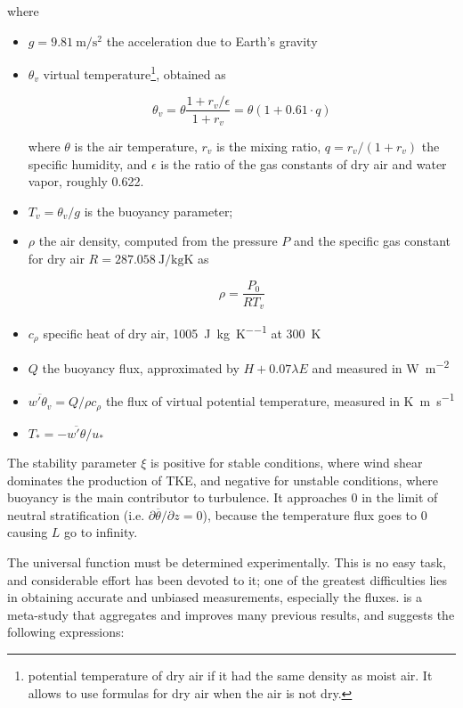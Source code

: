 \documentclass[a4paper]{book}
\begin{document}
\noindent where

\begin{itemize}
\item $g=\SI{9.81}{\meter\per\square\second}$ the acceleration due to Earth's gravity

\item $\theta_v$ virtual temperature\footnote{potential temperature of dry air if it had the same density as moist air. It allows to use formulas for dry air when the air is not dry.}, obtained as

\begin{equation}
\label{eq:vtemp}
\theta_v=\theta\frac{1+r_v/\epsilon}{1+r_v}=\theta(1+0.61\cdot q)
\end{equation}

\noindent where $\theta$ is the air temperature, $r_v$ is the mixing ratio, $q=r_v/(1+r_v)$ the specific humidity, and $\epsilon$ is the ratio of the gas constants of dry air and water vapor, roughly 0.622.

\item $T_v=\theta_v/g$ is the buoyancy parameter;

\item $\rho$ the air density, computed from the pressure $P$ and the specific gas constant for dry air $R=\SI{287.058}{\joule\per\kilo\gram\kelvin}$ as

$$
\rho=\frac{P_0}{RT_v}
$$


\item $c_\rho$ specific heat of dry air, \SI{1005}{\joule\per\kilo\gram\per\kelvin} at \SI{300}{\kelvin}
\item $Q$ the buoyancy flux, approximated by $H+0.07\lambda E$ and measured in \si{\watt\per\square\meter}
\item $\overline{w'\theta_v}=Q/\rho c_\rho$ the flux of virtual potential temperature, measured in \si{\kelvin\meter\per\second}
\item $T_*=-\overline{w'\theta}/u_*$
\end{itemize}

The stability parameter $\xi$ is positive for stable conditions, where wind shear dominates the production of TKE, and negative for unstable conditions, where buoyancy is the main contributor to turbulence. It approaches 0 in the limit of neutral stratification (i.e. $\partial\overline{\theta}/\partial z=0$), because the temperature flux goes to 0 causing $L$ go to infinity.

The universal function must be determined experimentally. This is no easy task, and considerable effort has been devoted to it; one of the greatest difficulties lies in obtaining accurate and unbiased measurements, especially the fluxes. \cite{hogstrom88} is a meta-study that aggregates and improves many previous results, and suggests the following expressions:
\end{document}
